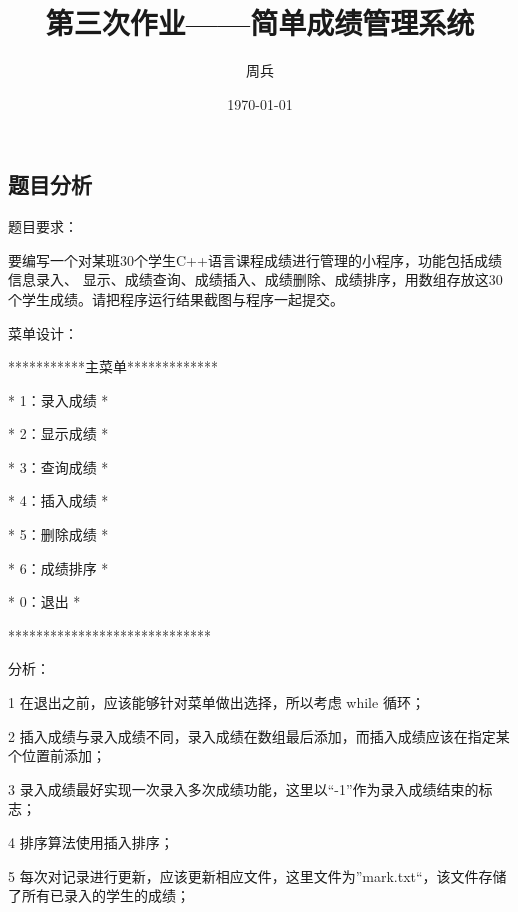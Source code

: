 \documentclass[14pt,aps,prb]{revtex4}
\begin{document}
\begin{spacing}{1.5}

\title{第三次作业——简单成绩管理系统}
\author{周兵}

\date{\today}%
\maketitle


\section{题目分析}
题目要求：

要编写一个对某班30个学生C++语言课程成绩进行管理的小程序，功能包括成绩信息录入、 显示、成绩查询、成绩插入、成绩删除、成绩排序，用数组存放这30个学生成绩。请把程序运行结果截图与程序一起提交。

菜单设计：

***********主菜单*************

*        1：录入成绩         *

*        2：显示成绩         *

*        3：查询成绩         *

*        4：插入成绩         *

*        5：删除成绩         *

*        6：成绩排序         *

*        0：退出             *

*****************************

分析：

1 在退出之前，应该能够针对菜单做出选择，所以考虑 while 循环；

2 插入成绩与录入成绩不同，录入成绩在数组最后添加，而插入成绩应该在指定某个位置前添加；

3 录入成绩最好实现一次录入多次成绩功能，这里以“-1”作为录入成绩结束的标志；

4 排序算法使用插入排序；

5 每次对记录进行更新，应该更新相应文件，这里文件为”mark.txt“，该文件存储了所有已录入的学生的成绩；


\end{spacing}
\end{document}
